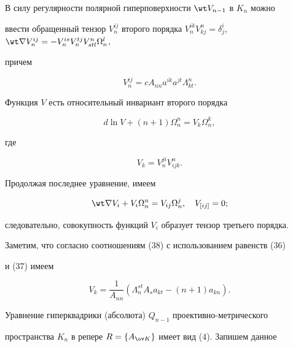  


В силу регулярности полярной гиперповерхности $\wt V_{n-1}$ в $K_n$ можно 


ввести обращенный тензор $V^{ij}_n$ второго порядка $V^{ik}_n 


V^n_{kj}=\delta^i_j$, $\wt \nabla V^{ij}_n=-V^{is}_n V^{tj}_n V^n_{stl}\Omega^l_n$, 


причем 


\begin{equation} 


V^{ij}_n=c A_{nn} a^{ik}a^{jt}\Lambda^n_{kt}. 


\end{equation} 


 


Функция $V$ есть относительный инвариант второго порядка 


$$ 


d\ln V+(n+1)\Omega^n_n=V_k\Omega^k_n, 


$$ 


где 


\begin{equation} 


V_k=V^{ji}_n V^n_{ijk}. 


\end{equation} 


Продолжая последнее уравнение, имеем 


$$ 


\wt\nabla V_i+V_i\Omega^n_n=V_{ij}\Omega^j_n,\quad V_{[ij]}=0; 


$$ 


следовательно, совокупность функций $V_i$ образует тензор третьего порядка. 


 


Заметим, что согласно соотношениям (38) с использованием равенств (36) 


и (37) имеем 


\begin{equation} 


V_k=\frac{1}{A_{nn}}(\Lambda^{st}_n A_s a_{kt}-(n+1)a_{kn}). 


\end{equation} 


 


Уравнение гиперквадрики (абсолюта) $Q_{n-1}$ проективно-метрического 


пространства $K_n$ в репере $R=\{A_{\ov K}\}$ имеет вид (4). Запишем данное 


